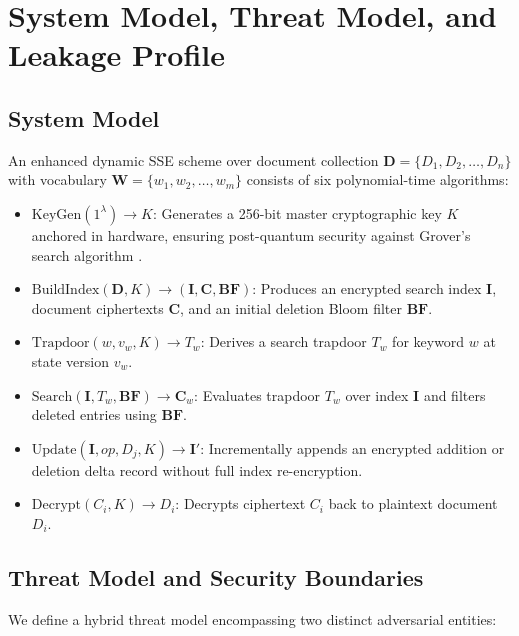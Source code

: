 \documentclass[runningheads]{llncs}
\begin{document}
\section{System Model, Threat Model, and Leakage Profile}

\subsection{System Model}
An enhanced dynamic SSE scheme over document collection $\mathbf{D} = \{D_1, D_2, \dots, D_n\}$ with vocabulary $\mathbf{W} = \{w_1, w_2, \dots, w_m\}$ consists of six polynomial-time algorithms:
\begin{itemize}
    \item $\text{KeyGen}(1^\lambda) \rightarrow K$: Generates a 256-bit master cryptographic key $K$ anchored in hardware, ensuring post-quantum security against Grover's search algorithm \cite{grover1996}.
    \item $\text{BuildIndex}(\mathbf{D}, K) \rightarrow (\mathbf{I}, \mathbf{C}, \mathbf{BF})$: Produces an encrypted search index $\mathbf{I}$, document ciphertexts $\mathbf{C}$, and an initial deletion Bloom filter $\mathbf{BF}$.
    \item $\text{Trapdoor}(w, v_w, K) \rightarrow T_w$: Derives a search trapdoor $T_w$ for keyword $w$ at state version $v_w$.
    \item $\text{Search}(\mathbf{I}, T_w, \mathbf{BF}) \rightarrow \mathbf{C}_w$: Evaluates trapdoor $T_w$ over index $\mathbf{I}$ and filters deleted entries using $\mathbf{BF}$.
    \item $\text{Update}(\mathbf{I}, op, D_j, K) \rightarrow \mathbf{I}'$: Incrementally appends an encrypted addition or deletion delta record without full index re-encryption.
    \item $\text{Decrypt}(C_i, K) \rightarrow D_i$: Decrypts ciphertext $C_i$ back to plaintext document $D_i$.
\end{itemize}

\subsection{Threat Model and Security Boundaries}
We define a hybrid threat model encompassing two distinct adversarial entities:
\end{document}
